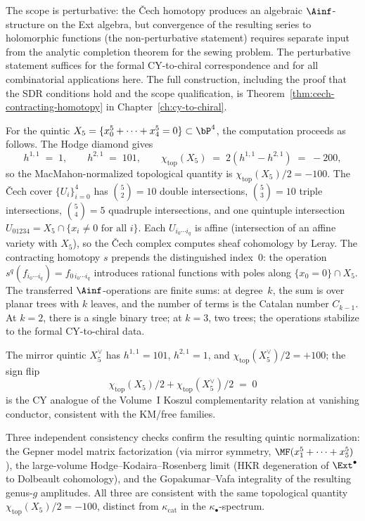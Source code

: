 The scope is perturbative: the \v{C}ech homotopy produces an
algebraic $\Ainf$-structure on the Ext algebra, but convergence
of the resulting series to holomorphic functions (the
non-perturbative statement) requires separate input from the
analytic completion theorem for the sewing problem. The perturbative statement suffices for
the formal CY-to-chiral correspondence and for all combinatorial
applications here. The full construction, including
the proof that the SDR conditions hold and the scope
qualification, is Theorem~\ref{thm:cech-contracting-homotopy}
in Chapter~\ref{ch:cy-to-chiral}.

For the quintic $X_5 = \{x_0^5 + \cdots + x_4^5 = 0\} \subset
\bP^4$, the computation proceeds as follows. The Hodge
diamond gives
\[
 h^{1,1} \;=\; 1,
 \qquad h^{2,1} \;=\; 101,
 \qquad \chi_{\mathrm{top}}(X_5) \;=\; 2(h^{1,1} - h^{2,1})
 \;=\; -200,
\]
so the MacMahon-normalized topological quantity is
$\chi_{\mathrm{top}}(X_5)/2 = -100$. The \v{C}ech cover
$\{U_i\}_{i=0}^{4}$ has
$\binom{5}{2} = 10$ double intersections,
$\binom{5}{3} = 10$ triple intersections,
$\binom{5}{4} = 5$ quadruple intersections, and one quintuple
intersection
$U_{01234} = X_5 \cap \{x_i \neq 0 \text{ for all } i\}$. Each
$U_{i_0 \cdots i_q}$ is affine (intersection of an affine
variety with $X_5$), so the \v{C}ech complex computes sheaf
cohomology by Leray. The contracting homotopy $s$ prepends the
distinguished index~$0$: the operation
$s^q(f_{i_0 \cdots i_q}) = f_{0\, i_0 \cdots i_q}$ introduces
rational functions with poles along $\{x_0 = 0\} \cap X_5$.
The transferred $\Ainf$-operations are finite sums: at
degree~$k$, the sum is over planar trees with $k$ leaves, and
the number of terms is the Catalan number $C_{k-1}$. At
$k = 2$, there is a single binary tree; at $k = 3$, two trees;
the operations stabilize to the formal CY-to-chiral data.

The mirror quintic $X_5^\vee$ has $h^{1,1} = 101$, $h^{2,1} = 1$,
and $\chi_{\mathrm{top}}(X_5^\vee)/2 = +100$; the sign flip
\[
 \chi_{\mathrm{top}}(X_5)/2 + \chi_{\mathrm{top}}(X_5^\vee)/2
 \;=\; 0
\]
is the CY analogue of the Volume~I Koszul complementarity relation
at vanishing conductor, consistent with the KM/free families.

Three independent consistency checks confirm the resulting
quintic normalization: the Gepner model matrix factorization
(via mirror symmetry, $\MF(x_1^5 + \cdots + x_5^5)$), the
large-volume Hodge--Kodaira--Rosenberg limit (HKR degeneration
of $\Ext^\bullet$ to Dolbeault cohomology), and the
Gopakumar--Vafa integrality of the resulting genus-$g$
amplitudes. All three are consistent with the same topological
quantity $\chi_{\mathrm{top}}(X_5)/2 = -100$, distinct from
$\kappa_{\mathrm{cat}}$ in the $\kappa_\bullet$-spectrum.

